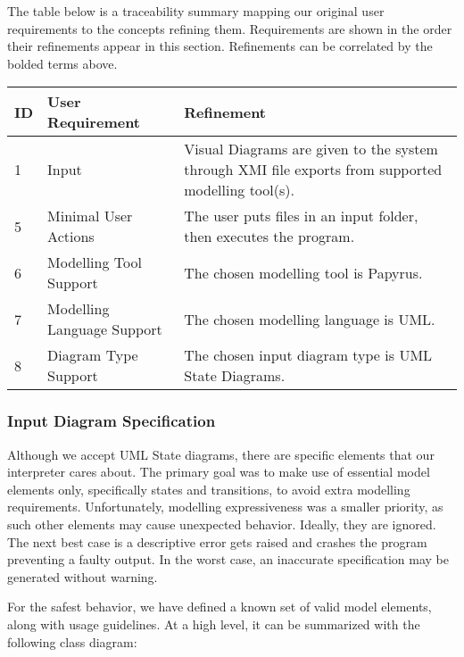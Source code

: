 \documentclass[11pt]{article}
\begin{document}
    The table below is a traceability summary mapping our original user requirements to the concepts refining them.
    Requirements are shown in the order their refinements appear in this section.
    Refinements can be correlated by the bolded terms above.

    \begin{table}[htbp]
    \centering
    \begin{tabularx}{\textwidth}{| l | l | X |}
        \hline
        \textbf{ID} & \textbf{User Requirement} & \textbf{Refinement} \\
        \hline
        1 & Input & Visual Diagrams are given to the system through XMI file exports from supported modelling tool(s). \\ \hline
        5 & Minimal User Actions & The user puts files in an input folder, then executes the program.  \\ \hline
        6 & Modelling Tool Support & The chosen modelling tool is Papyrus. \\ \hline
        7 & Modelling Language Support & The chosen modelling language is UML. \\ \hline
        8 & Diagram Type Support & The chosen input diagram type is UML State Diagrams. \\ \hline
    \end{tabularx}\label{tab:input-table}
    \end{table}

    \subsubsection{Input Diagram Specification}\label{subsubsec:input-specification}
    Although we accept UML State diagrams, there are specific elements that our interpreter cares about.
    The primary goal was to make use of essential model elements only, specifically states and transitions,
    to avoid extra modelling requirements.
    Unfortunately, modelling expressiveness was a smaller priority, as such
    other elements may cause unexpected behavior.
    Ideally, they are ignored.
    The next best case is a descriptive error gets raised and crashes the program preventing a faulty output.
    In the worst case, an inaccurate specification may be generated without warning.

    For the safest behavior, we have defined a known set of valid model elements, along with usage guidelines.
    At a high level, it can be summarized with the following class diagram:
    \\
\end{document}
